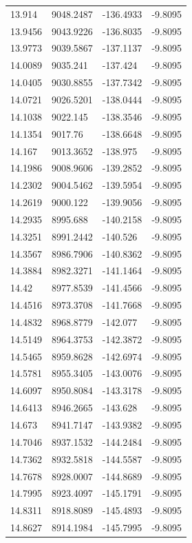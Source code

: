 \begin{table}[H]
\begin{tabular}{llll}
13.914 & 9048.2487 & -136.4933 & -9.8095 \\
13.9456 & 9043.9226 & -136.8035 & -9.8095 \\
13.9773 & 9039.5867 & -137.1137 & -9.8095 \\
14.0089 & 9035.241 & -137.424 & -9.8095 \\
14.0405 & 9030.8855 & -137.7342 & -9.8095 \\
14.0721 & 9026.5201 & -138.0444 & -9.8095 \\
14.1038 & 9022.145 & -138.3546 & -9.8095 \\
14.1354 & 9017.76 & -138.6648 & -9.8095 \\
14.167 & 9013.3652 & -138.975 & -9.8095 \\
14.1986 & 9008.9606 & -139.2852 & -9.8095 \\
14.2302 & 9004.5462 & -139.5954 & -9.8095 \\
14.2619 & 9000.122 & -139.9056 & -9.8095 \\
14.2935 & 8995.688 & -140.2158 & -9.8095 \\
14.3251 & 8991.2442 & -140.526 & -9.8095 \\
14.3567 & 8986.7906 & -140.8362 & -9.8095 \\
14.3884 & 8982.3271 & -141.1464 & -9.8095 \\
14.42 & 8977.8539 & -141.4566 & -9.8095 \\
14.4516 & 8973.3708 & -141.7668 & -9.8095 \\
14.4832 & 8968.8779 & -142.077 & -9.8095 \\
14.5149 & 8964.3753 & -142.3872 & -9.8095 \\
14.5465 & 8959.8628 & -142.6974 & -9.8095 \\
14.5781 & 8955.3405 & -143.0076 & -9.8095 \\
14.6097 & 8950.8084 & -143.3178 & -9.8095 \\
14.6413 & 8946.2665 & -143.628 & -9.8095 \\
14.673 & 8941.7147 & -143.9382 & -9.8095 \\
14.7046 & 8937.1532 & -144.2484 & -9.8095 \\
14.7362 & 8932.5818 & -144.5587 & -9.8095 \\
14.7678 & 8928.0007 & -144.8689 & -9.8095 \\
14.7995 & 8923.4097 & -145.1791 & -9.8095 \\
14.8311 & 8918.8089 & -145.4893 & -9.8095 \\
14.8627 & 8914.1984 & -145.7995 & -9.8095 \\

\end{tabular}
\end{table}
